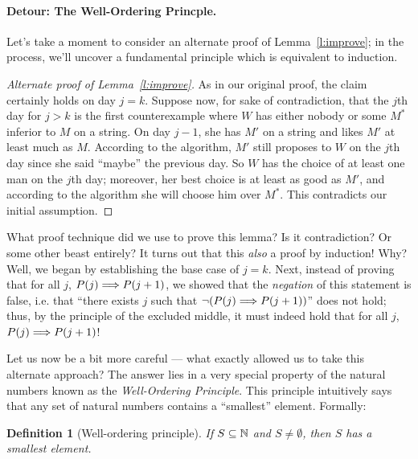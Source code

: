 \documentclass[11pt,fleqn]{article}
\newcounter{thm}
\newtheorem{definition}{Definition}[thm]
\begin{document}
\paragraph{Detour: The Well-Ordering Princple.} Let's take a moment to consider an alternate proof of Lemma~\ref{l:improve}; in the process, we'll uncover a fundamental principle which is equivalent to induction.

\begin{proof}[Alternate proof of Lemma~\ref{l:improve}]
As in our original proof, the claim certainly holds on day $j=k$. Suppose now, for sake of contradiction, that the $j$th
day for $j > k$ is the first counterexample where $W$ has either nobody
or some $M^\ast$ inferior to $M$ on a string. On day
$j - 1$, she has $M'$ on a string and likes $M'$ at least much as $M$.
According to the algorithm,
$M'$ still proposes to $W$ on the $j$th day since she said ``maybe'' the
previous day. So $W$ has the choice of at least one man on
the $j$th day; moreover, her best choice is at least as good as $M'$,
and according to the algorithm she will choose him over $M^\ast$. This contradicts
our initial assumption.
\end{proof}

What proof technique did we use to prove this lemma? Is it contradiction? Or some other beast entirely? It turns out that this \emph{also} a proof by induction! Why? Well, we began by establishing the base case of $j=k$. Next, instead of proving that for all $j$, $P(j)\Longrightarrow P(j+1)$, we showed that the \emph{negation} of this statement is false, i.e. that ``there exists $j$ such that  $\neg(P(j)\Longrightarrow P(j+1))$'' does not hold; thus, by the principle of the excluded middle, it must indeed hold that for all $j$, $P(j)\Longrightarrow P(j+1)$!


Let us now be a bit more careful --- what exactly allowed us to take this alternate approach?
The answer lies in a very special property of the natural numbers known as the \emph{Well-Ordering Principle}. This principle intuitively says that any set of natural numbers contains a ``smallest'' element. Formally:
\begin{definition}[Well-ordering principle]
    If $S \subseteq \mathbb{N}$ and $S \neq \emptyset$, then $S$ has a smallest element.
\end{definition}

\end{document}
